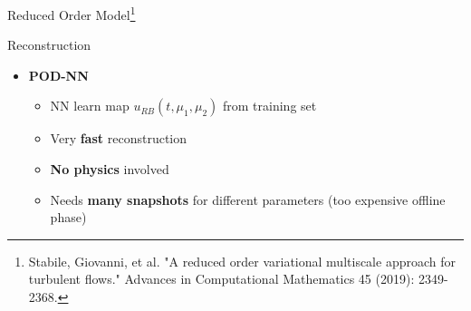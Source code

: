 \documentclass[9pt,compress,t,aspectratio=169]{beamer}
\newcommand{\1}{\begin{pmatrix}
		1\\
		1
\end{pmatrix}}
\newcommand{\highlight}[1]{\textbf{\color{bluemathlab}#1}}
\newcommand{\highlightB}[1]{\textbf{\color{black!15!orangemathlab}#1}}
\begin{document}
\begin{frame}{Reduced Order Model\footnote{Stabile, Giovanni, et al. "A reduced order variational multiscale approach for turbulent flows." Advances in Computational Mathematics 45 (2019): 2349-2368.}}
\begin{minipage}{0.49\textwidth}
{\begin{block}{Reconstruction}
\begin{itemize}
\begin{itemize}
				\item Less nonlinear iterations
				\item For the moment no computational advantage
			\end{itemize}
		\item \highlight{POD-NN}
		\begin{itemize}
			\item NN learn map $u_{RB}(t,\mu_1,\mu_2)$ from training set
			\item Very \highlight{fast} reconstruction
			\item \highlightB{No physics} involved
			\item Needs \highlightB{many snapshots} for different parameters (too expensive offline phase)
		\end{itemize}
		\end{itemize}
	\end{block}
}
\end{minipage}
\end{frame}
\end{document}
